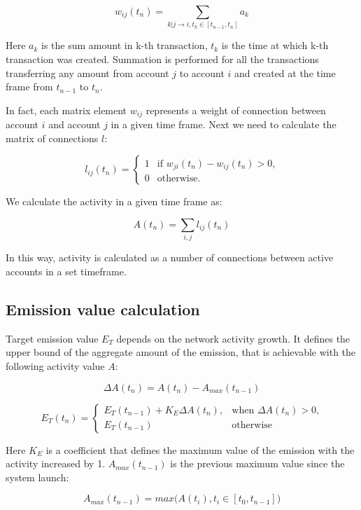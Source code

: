 \documentclass[a4paper,12pt]{article}
\begin{document}
$$
w_{ij}(t_n)=\sum_{k|j \to i, t_k \in [t_{n-1}, t_n]}a_k
$$

Here $a_k$  is the sum amount in k-th transaction, $t_k$ is the time at which k-th transaction was created. Summation is performed for all the transactions transferring any amount from account $j$ to account $i$ and created at the time frame from $t_{n-1}$ to $t_n$. 

In fact, each matrix element $w_{ij}$ represents a weight of connection between account $i$ and account $j$ in a given time frame. Next we need to calculate the matrix of connections $l$: 



$$
l_{ij}(t_n) = \begin{cases}
 1
 & \text{if $w_{ji}(t_n)-w_{ij}(t_n) > 0$,}\\
 0 & \text{otherwise.}
\end{cases}
$$

We calculate the activity in a given time frame as:



$$
A(t_n) = \sum_{i,j} l_{ij}(t_n)
$$

In this way, activity is calculated as a number of connections between active accounts in a set timeframe. 



\subsection{Emission value calculation}

Target emission value $E_T$ depends on the network activity growth. It defines the upper bound of the aggregate amount of the emission, that is achievable with the following activity value $A$:



$$
\Delta A(t_n) = A(t_n) - A_{max}(t_{n-1})
$$

$$
E_T(t_n) = \begin{cases}
 E_T(t_{n-1}) + K_E \Delta A(t_n),
 & \text{when $\Delta A(t_n) > 0$,}\\
 E_T(t_{n-1}) & \text{otherwise}
\end{cases}
$$

Here $K_E$ is a coefficient that defines the maximum value of the emission with the activity increased by 1. $A_{max}(t_{n-1})$ is the previous maximum value since the system launch:



$$
    A_{max}(t_{n-1}) = max \Big ( A(t_i), t_i \in [t_0, t_{n-1}] \Big )
$$
\end{document}
